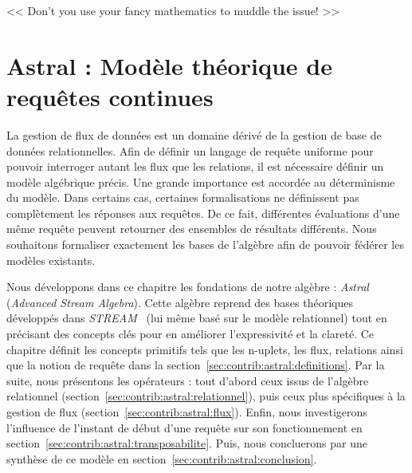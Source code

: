 \begin{savequote}[6cm]
<< Don't you use your fancy mathematics to muddle the issue! >>
\end{savequote}

\chapter{Astral : Modèle théorique de requêtes continues}\label{chap:contrib:astral}
\chaptertoc

La gestion de flux de données est un domaine dérivé de la gestion de base de données relationnelles. Afin de définir un langage de requête uniforme pour pouvoir interroger autant les flux que les relations, il est nécessaire définir un modèle algébrique précis. Une grande importance est accordée au déterminisme du modèle. Dans certains cas, certaines formalisations ne définissent pas complètement les réponses aux requêtes. De ce fait, différentes évaluations d'une même requête peuvent retourner des ensembles de résultats différents. Nous souhaitons formaliser exactement les bases de l'algèbre afin de pouvoir fédérer les modèles existants.

Nous développons dans ce chapitre les fondations de notre algèbre : \textit{Astral} (\textit{Advanced Stream Algebra}). Cette algèbre reprend des bases théoriques développés dans \textit{STREAM}~\cite{Arasu:stream} (lui même basé sur le modèle relationnel) tout en précisant des concepts clés pour en améliorer l'expressivité et la clareté. Ce chapitre définit les concepts primitifs tels que les n-uplets, les flux, relations ainsi que la notion de requête dans la section~\ref{sec:contrib:astral:definitions}. Par la suite, nous présentons les opérateurs : tout d'abord ceux issus de l'algèbre relationnel (section~\ref{sec:contrib:astral:relationnel}), puis ceux plus spécifiques à la gestion de flux (section~\ref{sec:contrib:astral:flux}). Enfin, nous investigerons l'influence de l'instant de début d'une requête sur son fonctionnement en section~\ref{sec:contrib:astral:transposabilite}. Puis, nous concluerons par une synthèse de ce modèle en section~\ref{sec:contrib:astral:conclusion}.






